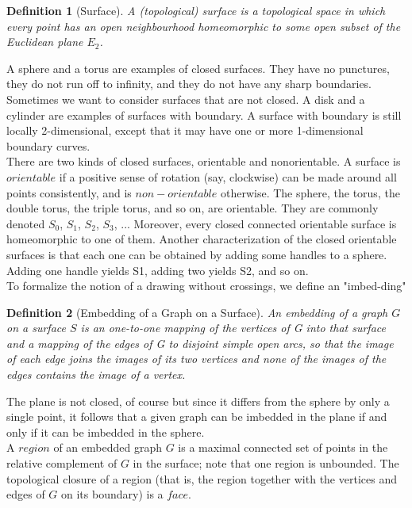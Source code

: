 \documentclass[10pt]{article}
\newtheorem{definition}{Definition}
\begin{document}
\begin{definition}[Surface]
A (topological) surface is a topological space in which every point has an open neighbourhood homeomorphic to some open subset of the Euclidean plane $E_2$.
\end{definition}

A sphere and a torus are examples of closed surfaces. They have no punctures, they do not run off to infinity, and they do not have any sharp boundaries. Sometimes we want to consider surfaces that are not closed. A disk and a cylinder are examples of surfaces with boundary. A surface with boundary is still locally 2-dimensional, except that it may have one or more 1-dimensional boundary curves.\\

There are two kinds of closed surfaces, orientable and nonorientable. A surface is $orientable$ if a positive sense of rotation (say, clockwise) can be made around all points consistently, and is $non-orientable$ otherwise. The sphere, the torus, the double torus, the triple torus, and so on, are orientable. They are commonly denoted $S_0$, $S_1$, $S_2$, $S_3$, ... Moreover, every closed connected orientable surface is homeomorphic to one of them. Another characterization of the closed orientable surfaces is that each one can be obtained by adding some handles to a sphere. Adding one handle yields S1, adding two yields S2, and so on.\\

To formalize the notion of a drawing without crossings, we define an "imbed-ding"\\
  
\begin{definition}[Embedding of a Graph on a Surface]
An embedding of a graph $G$ on a surface $S$ is an one-to-one mapping of the vertices of G into that surface and a mapping of the edges of G to disjoint simple open arcs, so that the image of each edge joins the images of its two vertices and none of the images of the edges contains the image of a vertex.
\end{definition}

The plane is not closed, of course but since it differs from the sphere by only a single point, it follows that a given graph can be imbedded in the plane if and only if it can be imbedded in the sphere.\\

A $region$ of an embedded graph $G$ is a maximal connected set of points in the relative complement of $G$ in the surface; note that one region is unbounded. The topological closure of a region (that is, the region together with the vertices and edges of $G$ on its boundary) is a $face$.
\end{document}
